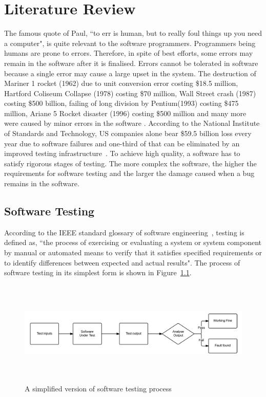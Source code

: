  
\chapter{Literature Review}
\label{chap:softwareTesting}
The famous quote of Paul, ``to err is human, but to really foul things up you need a computer", is quite relevant to the software programmers. Programmers being humans are prone to errors. Therefore, in spite of best efforts, some errors may remain in the software after it is finalised.  Errors cannot be tolerated in software because a single error may cause a large upset in the system. The destruction of Mariner 1 rocket (1962) due to unit conversion error costing \$18.5 million, Hartford Coliseum Collapse (1978) costing \$70 million, Wall Street crash (1987) costing \$500 billion, failing of long division by Pentium\texttrademark (1993) costing \$475 million, Ariane 5 Rocket disaster (1996) costing \$500 million and many more were caused by minor errors in the software \cite{garfinkel2005history, toweysoftware}. According to the National Institute of Standards and Technology, US companies alone bear \$59.5 billion loss every year due to software failures and one-third of that can be eliminated by an improved testing infrastructure~\cite{tassey2002economic}. To achieve high quality, a software has to satisfy rigorous stages of testing. The more complex the software, the higher the requirements for software testing and the larger the damage caused when a bug remains in the software.

\section{Software Testing}
According to the IEEE standard glossary of software engineering~\cite{american1984}, testing is defined as, ``the process of exercising or evaluating a system or system component by manual or automated means to verify that it satisfies specified requirements or to identify differences between expected and actual results". The process of software testing in its simplest form is shown in Figure~\ref{fig:softwareTestingParts_2}. 

\begin{figure}[h]
	\centering
	\centerline{\includegraphics[width=16cm, height=5cm]{chapter2/softwareTesting.png}}
	\caption{A simplified version of software testing process}
	\label{fig:softwareTestingParts_2}
\end{figure}

